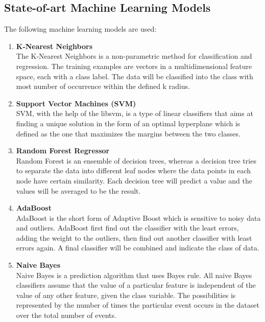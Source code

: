 \documentclass{article}
\begin{document}
	\subsection{State-of-art Machine Learning Models}
	The following machine learning models are used:
	\begin{enumerate}
		\item \textbf{K-Nearest Neighbors} \\
		The K-Nearest Neighbors is a non-parametric method for classification and regression. 
		The training examples are vectors in a multidimensional feature space, each with a class label. 
		The data will be classified into the class with most number of occurrence within the defined k radius.
	
		\item \textbf{Support Vector Machines (SVM)} \\
		SVM, with the help of the libsvm, is a type of linear classiﬁers that aims at ﬁnding 
		a unique solution in the form of an optimal hyperplane which is deﬁned as the one that maximizes the margins between the two classes.

		\item \textbf{Random Forest Regressor} \\
		Random Forest is an ensemble of decision trees, whereas a decision tree tries to separate the data into different leaf nodes 
		where the data points in each node have certain similarity. Each decision tree will predict a value and the values will be averaged to be the result.
	
		\item \textbf{AdaBoost} \\
		AdaBoost is the short form of Adaptive Boost which is sensitive to noisy data and outliers. 
		AdaBoost first find out the classifier with the least errors, adding the weight to the outliers, then find out another classifier with least errors again.
		A final classifier will be combined and indicate the class of data.
	
		\item \textbf{Naive Bayes} \\ 
		Naive Bayes is a prediction algorithm that uses Bayes rule. 
		All naive Bayes classifiers assume that the value of a particular feature is independent of the value of any other feature, given the class variable. 
		The possibilities is represented by the number of times the particular event occurs in the dataset over the total number of events. 
	\end{enumerate}
\end{document}
